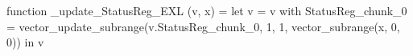 function _update_StatusReg_EXL (v, x) = let v = { v with StatusReg_chunk_0 = vector_update_subrange(v.StatusReg_chunk_0, 1, 1, vector_subrange(x, 0, 0)) } in v
